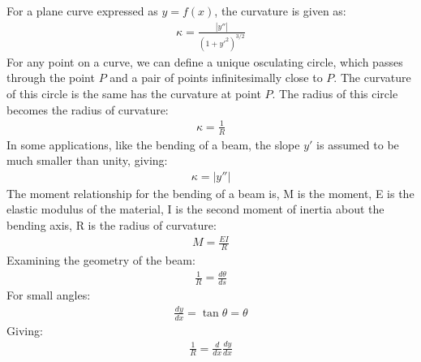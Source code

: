 \documentclass{article}
\numberwithin{equation}{section}
\begin{document}
For a plane curve expressed as $y=f(x)$, the curvature is given as: 
\begin{align*}
\kappa=\frac{|y''|}{(1+y'^2)^{3/2}}
\end{align*}
For any point on a curve, we can define a unique osculating circle, which passes through the point $P$ and a pair of points infinitesimally close to $P$. The curvature of this circle is the same has the curvature at point $P$. The radius of this circle becomes the radius of curvature:
\begin{align*}
\kappa=\frac{1}{R}
\end{align*}
In some applications, like the bending of a beam, the slope $y'$ is assumed to be much smaller than unity, giving:
\begin{align*}
\kappa=|y''|
\end{align*}
The moment relationship for the bending of a beam is, M is the moment, E is the elastic modulus of the material, I is the second moment of inertia about the bending axis, R is the radius of curvature:
\begin{align*}
M=\frac{EI}{R}
\end{align*}
Examining the geometry of the beam:
\begin{align*}
\frac{1}{R}=\frac{d\theta}{ds}
\end{align*}
For small angles:
\begin{align*}
\frac{dy}{dx}=\tan \theta= \theta
\end{align*}
Giving:
\begin{align*}
\frac{1}{R}=\frac{d}{dx}\frac{dy}{dx}
\end{align*}
\end{document}
